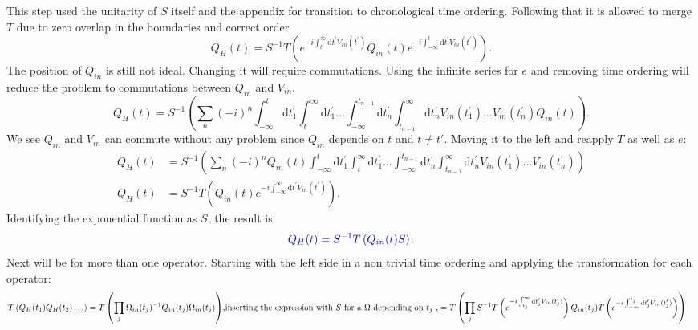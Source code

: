 \documentclass[12pt, titlepage]{article}
\begin{document}
This step used the unitarity of $ S $ itself and the appendix for transition to chronological time ordering. Following that it is allowed to merge $ T $ due to zero overlap in the boundaries and correct order
\begin{equation}
Q_{H}(t)
=S^{-1}
T\left( 
 e^{-i\int_{t}^{\infty}\mathrm{d}t^{\prime} V_{in}(t^{\prime})}
Q_{in}(t)
 e^{-i\int_{-\infty}^{t}\mathrm{d}t^{\prime} V_{in}(t^{\prime})}
\right) .
\end{equation}
The position of $ Q_{in}  $ is still not ideal. Changing it will require commutations. Using the infinite series for $ e $ and removing time ordering will reduce the problem to commutations between $ Q_{in} $ and $ V_{in} $.
\begin{equation}
Q_{H}(t)
=
S^{-1}
\left( 
\sum_{n}
(-i)^{n}
\int_{-\infty}^{t}\mathrm{d}t_{1}^{\prime}
\int_{t}^{\infty}\mathrm{d}t_{1}^{\prime}
\ldots
\int_{-\infty}^{t_{n-1}}\mathrm{d}t_{n}^{\prime}
\int_{t_{n-1}}^{\infty}\mathrm{d}t_{n}^{\prime}
V_{in}(t_{1}^{\prime})
\ldots
V_{in}(t_{n}^{\prime})
Q_{in}(t)
\right) .
\end{equation}
We see $ Q_{in} $ and $ V_{in} $ can commute without any problem since $ Q_{in} $ depends on $  t $ and $ t \neq t' $. Moving it to the left and reapply $ T $ as well as $ e $:
\begin{subequations}
\begin{align}
Q_{H}(t)
&=
S^{-1}
\left( 
\sum_{n}
(-i)^{n}
Q_{in}(t)
\int_{-\infty}^{t}\mathrm{d}t_{1}^{\prime}
\int_{t}^{\infty}\mathrm{d}t_{1}^{\prime}
\ldots
\int_{-\infty}^{t_{n-1}}\mathrm{d}t_{n}^{\prime}
\int_{t_{n-1}}^{\infty}\mathrm{d}t_{n}^{\prime}
V_{in}(t_{1}^{\prime})
\ldots
V_{in}(t_{n}^{\prime})
\right) 
\\
Q_{H}(t)
&=S^{-1}
T\left( 
Q_{in}(t)
 e^{-i\int_{-\infty}^{\infty}\mathrm{d}t^{\prime} V_{in}(t^{\prime})}
\right) .
\end{align}
\end{subequations}
Identifying the exponential function as $ S $, the result is:
\begin{equation}\textcolor[RGB]{0,0,204}{
Q_{H}(t)=
S^{-1}
T\left( 
Q_{in}(t)
S
\right) .
}
\end{equation}
Next will be for more than one operator. Starting with the left side in a non trivial time ordering and applying the transformation for each operator:
\begin{subequations}
\begin{align}
T\left( 
Q_{H}(t_1)
Q_{H}(t_2)
\ldots
\right) 
=
T\left( 
\prod_{j}
\Omega_{in}(t_{j})^{-1}
Q_{in}(t_j)
\Omega_{in}(t_{j})
\right)
\end{align}
\text{,inserting the expression with $ S $ for a $ \Omega $ depending on $ t_{j} $  ,}
\begin{align}
&=
T\left( 
\prod_{j}
S^{-1}
T\left( 
 e^{-i\int_{t_{j}}^{\infty}\mathrm{d}t^{\prime}_{j} V_{in}(t^{\prime}_{j})}
\right) 
%
Q_{in}(t_{j})
%
T
\left( 
 e^{-i\int_{-\infty}^{t_{j}}\mathrm{d}t^{\prime}_{j} V_{in}(t^{\prime}_{j})}
\right) 
\right) 
\end{align}
\end{subequations}
\end{document}
